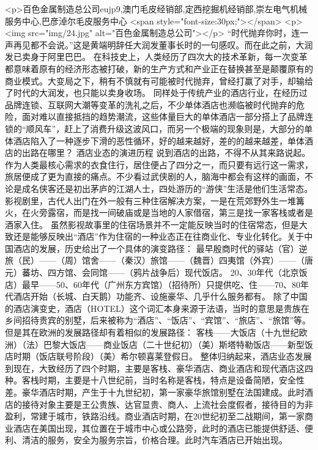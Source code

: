 {{{{{{{{{{{{{{<p>百色金属制造总公司eujp9,澳门毛皮经销部,定西挖掘机经销部,崇左电气机械服务中心,巴彦淖尔毛皮服务中心
	 <span style="font-size:30px;"></span>
<p> <img src="img/24.jpg" alt="百色金属制造总公司"></p>
	   “时代抛弃你时，连一声再见都不会说。”这是黄端明辞任大润发董事长时的一句感叹。而在此之前，大润发已卖身于阿里巴巴。
在科技史上，人类经历了四次大的技术革新，每一次变革都意味着原有的经济形态被打破，新的生产方式和产业正在替换甚至是颠覆原有的商业模式。大变局之下，稍有不慎就有可能被时代抛弃，曾经打赢了对手，却输给了时代的大润发，也只能以卖身收场。
同样处于传统产业的酒店行业，在经历过品牌连锁、互联网大潮等变革的洗礼之后，不少单体酒店也濒临被时代抛弃的危险，面对难以直接抵挡的趋势潮流，这些体量巨大的单体酒店一部分搭上了品牌连锁的“顺风车”，赶上了消费升级这波风口，而另一个极端的现象则是，大部分的单体酒店陷入了一种逐步下滑的恶性循环，好的越来越好，差的的越来越差，单体酒店的出路在哪里？
酒店业态的演进历程
说到酒店的出路，不得不从其来路说起。作为人类最核心需求的衣食住行，居住便占了四分之一，而只要有远行这一需求，旅居便成了更为直接的痛点。不少看过武侠剧的人，脑海中都会有这样的画面，不论是成名侠客还是初出茅庐的江湖人士，四处游历的“游侠”生活是他们生活常态。影视剧里，古代人出门在外一般有三种住宿解决方案，一是在荒郊野外生一堆篝火，在火旁露宿，而是找一间破庙或是当地的人家借宿，第三是找一家客栈或者是酒家入住。
虽然影视故事里的住宿场景并不一定能反映当时的住宿常态，但是大致还是能够反映出“酒店”作为住宿的一种业态正在往商业化、专业化转化。关于中国酒店的发展，历史给出了一个具体的演变路径：
最早殷商时代的驿站（官）逆旅（民）——（周）馆舍——（秦汉）旅馆——（魏晋）四夷馆（外宾）——（唐元）蕃坊、四方馆、会同馆——（鸦片战争后）现代饭店。
20、30年代（北京饭店）最早——50、60年代（广州东方宾馆）（招待所）只提供吃、住——70、80年代酒店开始（长城、白天鹅）功能齐、设施豪华、几乎什么服务都有。
除了中国的酒店演变史，酒店（HOTEL）这个词汇本身来源于法语，当时的意思是贵族在乡间招待贵宾的别墅，后来被称为“酒店”、“饭店”、“宾馆”、“旅店”、“旅馆”等。但是其在欧洲的发展路径却有着相似的发展路径：
客栈——大饭店（十九世纪欧洲）（法）巴黎大饭店——商业饭店（二十世纪初）（美）斯塔特勒饭店——新型饭店时期（饭店联号阶段）（美）希尔顿喜莱登假日。
整体归纳起来，酒店业态发展到现在，大致经历了四个时期，主要是客栈、豪华酒店、商业酒店和现代酒店这四种。客栈时期，主要是十八世纪前，当时名称是客栈，特点是设备简陋，安全性差。豪华酒店时期，产生于十九世纪初，第一家豪华旅馆别墅在法国建成。此时酒店的接待对象主要是王公贵族、达官显贵、商人、上流社会度假者，接待目的为非盈利，常建于城市，铁路沿线。商业酒店时期，在20世纪初至二战期间，第一家商业酒店在美国出现，其位置在于城市中心或公路旁，此时的酒店已能提供舒适、便利、清洁的服务，安全为服务宗旨，价格合理。此时汽车酒店已开始出现。
}}}}}}}}}}}}}}
